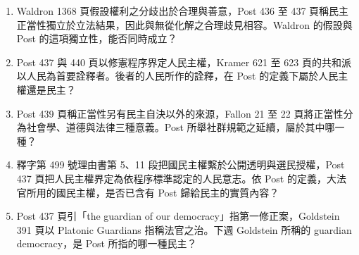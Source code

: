 \begin{enumerate}
\tightlist
\item Waldron 1368 頁假設權利之分歧出於合理與善意，Post 436 至 437 頁稱民主正當性獨立於立法結果，因此與無從化解之合理歧見相容。Waldron 的假設與 Post 的這項獨立性，能否同時成立？
\item Post 437 與 440 頁以修憲程序界定人民主權，Kramer 621 至 623 頁的共和派以人民為首要詮釋者。後者的人民所作的詮釋，在 Post 的定義下屬於人民主權還是民主？
\item Post 439 頁稱正當性另有民主自決以外的來源，Fallon 21 至 22 頁將正當性分為社會學、道德與法律三種意義。Post 所舉社群規範之延續，屬於其中哪一種？
\item 釋字第 499 號理由書第 5、11 段把國民主權繫於公開透明與選民授權，Post 437 頁把人民主權界定為依程序標準認定的人民意志。依 Post 的定義，大法官所用的國民主權，是否已含有 Post 歸給民主的實質內容？
\item Post 437 頁引「the guardian of our democracy」指第一修正案，Goldstein 391 頁以 Platonic Guardians 指稱法官之治。下週 Goldstein 所稱的 guardian democracy，是 Post 所指的哪一種民主？
\end{enumerate}
